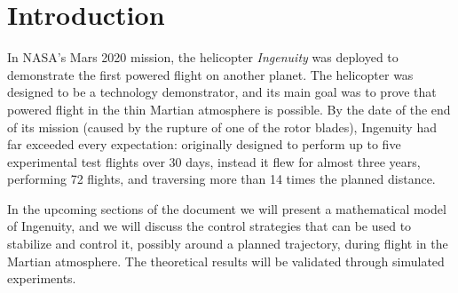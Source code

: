 \section{Introduction}
In NASA's Mars 2020 mission, the helicopter \textit{Ingenuity} was deployed to demonstrate the first powered flight on another planet. The helicopter was designed to be a technology demonstrator, and its main goal was to prove that powered flight in the thin Martian atmosphere is possible. By the date of the end of its mission (caused by the rupture of one of the rotor blades), Ingenuity had far exceeded every expectation: originally designed to perform up to five experimental test flights over 30 days, instead it flew for almost three years, performing 72 flights, and traversing more than 14 times the planned distance.

In the upcoming sections of the document we will present a mathematical model of Ingenuity, and we will discuss the control strategies that can be used to stabilize and control it, possibly around a planned trajectory, during flight in the Martian atmosphere. The theoretical results will be validated through simulated experiments.



